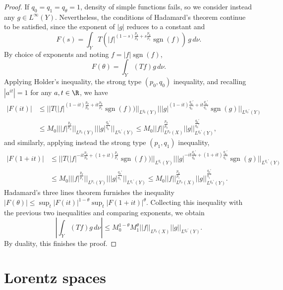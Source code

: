 \documentclass[reqno]{amsart}
\theoremstyle{definition}
\theoremstyle{remark}
\begin{document}
\begin{proof}
	If $q_0 = q_1 = q_\theta = 1$, density of simple functions fails, so we consider instead any $g \in L^\infty (Y)$. Nevertheless, the conditions of Hadamard's theorem continue to be satisfied, since the exponent of $|g|$ reduces to a constant and 
		\[ F(s) = \int_Y T\left( |f|^{(1 - s)\frac{p_\theta}{p_0} + s \frac{p_\theta}{p_1}} \operatorname{sgn} (f) \right) \, g \, d\nu. \]
	By choice of exponents and noting $f =|f| \operatorname{sgn} (f)$, 
		\[ F(\theta) = \int_Y (Tf) g \, d\nu. \]
	Applying Holder's inequality, the strong type $(p_0, q_0)$ inequality, and recalling $|a^{it}| = 1$ for any $a, t \in \R$, we have
		\begin{align*}
			|F(it)|
				&\leq \Big|\Big| T\Big( |f|^{(1 - it)\frac{p_\theta}{p_0} + it \frac{p_\theta}{p_1}} \operatorname{sgn} (f) \Big)  \Big|\Big|_{L^{q_0} (Y)} \Big| \Big| |g|^{(1 - it)\frac{q_\theta'}{q_0'} + it \frac{q_\theta'}{q_1'}} \operatorname{sgn} (g) \Big| \Big|_{L^{q_0'} (Y)}\\
				& \leq M_0 \Big|\Big| |f|^{\frac{p_\theta}{p_0}} \Big|\Big|_{L^{p_0} (Y)} \Big| \Big| |g|^{\frac{q_\theta'}{q_0'}} \Big| \Big|_{L^{q_0'} (Y)}  \leq M_0 ||f||_{L^{p_\theta} (X)}^{\frac{p_\theta}{p_0}} ||g||_{L^{q_\theta'} (Y)}^{\frac{q_\theta'}{q_0'}},
		\end{align*}
	and similarly, applying instead the strong type $(p_1, q_1)$ inequality, 
		\begin{align*}			
			|F(1 + it)|
				&\leq  \Big|\Big| T\Big( |f|^{- it\frac{p_\theta}{p_0} + (1 + it) \frac{p_\theta}{p_1}} \operatorname{sgn} (f) \Big)  \Big|\Big|_{L^{q_1} (Y)} \Big| \Big| |g|^{ - it\frac{q_\theta'}{q_0'} + (1 + it) \frac{q_\theta'}{q_1'}} \operatorname{sgn} (g) \Big| \Big|_{L^{q_1'} (Y)}\\
				& \leq M_0 \Big|\Big| |f|^{\frac{p_\theta}{p_1}} \Big|\Big|_{L^{p_1} (Y)} \Big| \Big| |g|^{\frac{q_\theta'}{q_1'}} \Big| \Big|_{L^{q_1'} (Y)}  \leq M_0 ||f||_{L^{p_\theta} (X)}^{\frac{p_\theta}{p_1}} ||g||_{L^{q_\theta'} (Y)}^{\frac{q_\theta'}{q_1'}}.
		\end{align*}		
	Hadamard's three lines theorem furnishes the inequality $|F(\theta)| \leq \sup_t |F(it)|^{1 - \theta} \sup_t |F(1 + it)|^{\theta}$. Collecting this inequality with the previous two inequalities and comparing exponents, we obtain
		\[ \left| \int_Y (Tf) g \, d\nu \right| \leq  M_0^{1 - \theta} M_1^\theta ||f||_{L^{p_\theta} (X)} ||g||_{L^{q_\theta'} (Y)}. \]
	By duality, this finishes the proof. 
\end{proof}

\section{Lorentz spaces}
\end{document}
